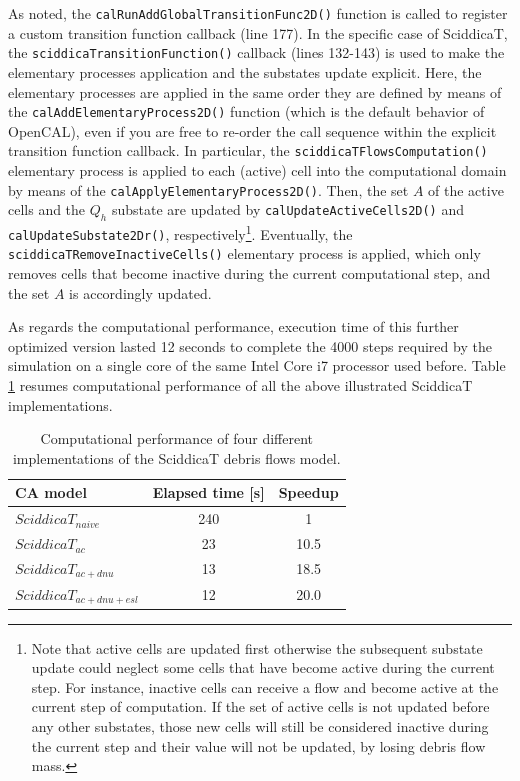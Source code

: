 As noted, the \verb'calRunAddGlobalTransitionFunc2D()' function is
called to register a custom transition function callback (line
177). In the specific case of SciddicaT, the
\verb'sciddicaTransitionFunction()' callback (lines 132-143) is used
to make the elementary processes application and the substates update
explicit. Here, the elementary processes are applied in the same order
they are defined by means of the \verb'calAddElementaryProcess2D()'
function (which is the default behavior of OpenCAL), even if you are
free to re-order the call sequence within the explicit transition
function callback. In particular, the \verb'sciddicaTFlowsComputation()'
elementary process is applied to each (active) cell into the
computational domain by means of the
\verb'calApplyElementaryProcess2D()'. Then, the set $A$ of the active
cells and the $Q_h$ substate are updated by
\verb'calUpdateActiveCells2D()' and \verb'calUpdateSubstate2Dr()',
respectively\footnote{Note that active cells are updated first
  otherwise the subsequent substate update could neglect some cells
  that have become active during the current step. For instance,
  inactive cells can receive a flow and become active at the current
  step of computation. If the set of active cells is not updated
  before any other substates, those new cells will still be considered
  inactive during the current step and their value will not be
  updated, by losing debris flow mass.}. Eventually, the
\verb'sciddicaTRemoveInactiveCells()' elementary process is
applied, which only removes cells that become inactive during the
current computational step, and the set $A$ is accordingly updated.


As regards the computational performance, execution time of this
further optimized version lasted 12 seconds to complete the 4000 steps
required by the simulation on a single core of the same Intel Core i7
processor used before. Table \ref{tab:speedup} resumes computational
performance of all the above illustrated SciddicaT implementations.

\begin{table}
  \centering
  \begin{tabular}{l|c|c}
    \hline
    CA model & Elapsed time [s] & Speedup \\
    \hline
    $SciddicaT_{naive}$      & 240 & 1\\
    $SciddicaT_{ac}$         & 23  & 10.5\\
    $SciddicaT_{ac+dnu}$     & 13  & 18.5\\
    $SciddicaT_{ac+dnu+esl}$  & 12  & 20.0\\
    \hline
  \end{tabular}
  \caption{Computational performance of four different
    implementations of the SciddicaT debris flows model.}
  \label{tab:speedup}
\end{table}



